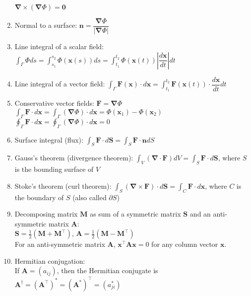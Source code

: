 \documentclass[fleqn]{article}
\begin{document}
\begin{enumerate}
        $\bm{\nabla}\times(\bm{\nabla}\Phi)=\mathbf{0}$
    \item Normal to a surface:\smallbreak
        $\mathbf{n}=\dfrac{\bm{\nabla}\Phi}{|\bm{\nabla}\Phi|}$
    \item Line integral of a scalar field:\smallbreak
        $\displaystyle\int_\Gamma\Phi ds=\displaystyle\int_{s_1}^{s_2}\Phi(\mathbf{x}(s))ds=\displaystyle\int_{t_1}^{t_2}\Phi(\mathbf{x}(t))\left|\dfrac{d\mathbf{x}}{dt}\right|dt$
    \item Line integral of a vector field:\smallbreak
        $\displaystyle\int_\Gamma\mathbf{F}(\mathbf{x})\cdot d\mathbf{x}=\displaystyle\int_{t_1}^{t_2}\mathbf{F}(\mathbf{x}(t))\cdot\dfrac{d\mathbf{x}}{dt}dt$
    \item Conservative vector fields: $\mathbf{F}=\bm{\nabla}\Phi$\smallbreak
        $\displaystyle\int_\Gamma\mathbf{F}\cdot d\mathbf{x}=\displaystyle\int_\Gamma(\bm{\nabla}\Phi)\cdot d\mathbf{x}=\Phi(\mathbf{x}_1)-\Phi(\mathbf{x}_2)$\smallbreak
        $\displaystyle\oint_\Gamma\mathbf{F}\cdot d\mathbf{x}=\displaystyle\oint_\Gamma(\bm{\nabla}\Phi)\cdot d\mathbf{x}=0$
    \item Surface integral (flux):\smallbreak
        $\displaystyle\int_S\mathbf{F}\cdot d\mathbf{S}=\displaystyle\int_S\mathbf{F}\cdot\mathbf{n}dS$
    \item Gauss's theorem (divergence theorem):\smallbreak
        $\displaystyle\int_V(\bm{\nabla}\cdot\mathbf{F})dV=\displaystyle\int_S\mathbf{F}\cdot d\mathbf{S}$, where $S$ is the bounding surface of $V$
    \item Stoke's theorem (curl theorem):\smallbreak
        $\displaystyle\int_S(\bm{\nabla}\times\mathbf{F})\cdot d\mathbf{S}=\displaystyle\int_C\mathbf{F}\cdot d\mathbf{x}$, where $C$ is the boundary of $S$ (also called $\partial S$)
    \newpage
    \item Decomposing matrix $\mathbf{M}$ as sum of a symmetric matrix $\mathbf{S}$ and an anti-symmetric matrix $\mathbf{A}$: \\
        $\mathbf{S}=\frac{1}{2}(\mathbf{M}+\mathbf{M}^\top)$, $\mathbf{A}=\frac{1}{2}(\mathbf{M}-\mathbf{M}^\top)$\\
        For an anti-symmetric matrix $\mathbf{A}$, $\mathbf{x}^\top\mathbf{Ax}=0$ for any column vector $\mathbf{x}$.
    \item Hermitian conjugation:\\
        If $\mathbf{A}=(a_{ij})$, then the Hermitian conjugate is $\mathbf{A}^\dagger=(\mathbf{A}^\top)^*=(\mathbf{A}^*)^\top=(a^*_{ji})$\\

\end{enumerate}
\end{document}
